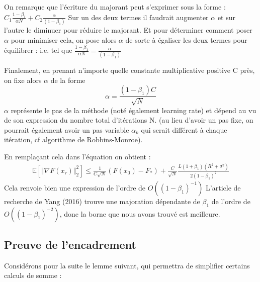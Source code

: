 \documentclass{article}
\begin{document}
\bigskip

On remarque que l'écriture du majorant peut s'exprimer sous la forme : $C_1 \frac{1-\beta_1}{\alpha N}+C_2 \frac{\alpha}{ (1- \beta_1)}$ 
Sur un des deux termes il faudrait augmenter $\alpha$ et sur l'autre le diminuer pour réduire le majorant. Et pour déterminer comment poser $\alpha$ pour minimiser cela, on pose alors $\alpha$ de sorte à égaliser les deux termes pour équilibrer : i.e. tel que $ \frac{1-\beta_1}{\alpha N}=\frac{\alpha}{ (1- \beta_1)}$ 

\bigskip

Finalement, en prenant n'importe quelle constante multiplicative positive C près, on fixe alors $\alpha$ de la forme 
\begin{equation}
    \alpha=\frac{(1-\beta_1) C}{\sqrt{N}}
\end{equation}
$\alpha$ représente le pas de la méthode (noté également learning rate) et dépend au vu de son expression du nombre total d'itérations N. (au lieu d'avoir un pas fixe, on pourrait également avoir un pas variable $\alpha_k$ qui serait différent à chaque itération, cf algorithme de Robbins-Monroe).

\bigskip

En remplaçant cela dans l'équation on obtient : 
\begin{eqnarray*}
    \mathbb{E}[ \Vert \nabla F(x_\tau) \Vert ^2_2] \leq \frac{1}{C \sqrt{N}} (F(x_0)-F_*) + \frac{C }{\sqrt{N}} \frac{ L (1+ \beta_1) (R^2+ \sigma^2)}{2(1- \beta_1)^2} 
\end{eqnarray*}
Cela renvoie bien une expression de l'ordre de $O((1-\beta_1)^{-1})$
L'article de recherche de Yang (2016) trouve une majoration dépendante de $\beta_1$ de l'ordre de $O((1-\beta_1)^{-2})$, donc la borne que nous avons trouvé est meilleure. 
\begin{equation}
    \label{eq:B10_inertie}
\end{equation}

\subsection{Preuve de l'encadrement}

Considérons pour la suite le lemme suivant, qui permettra de simplifier certains calculs de somme :

\bigskip
\end{document}
